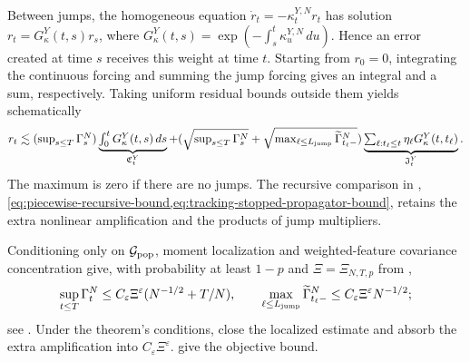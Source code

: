 Between jumps, the homogeneous equation
\(\dot r_t=-\kappa_t^{Y,N}r_t\) has solution
\(r_t=G_\kappa^Y(t,s)r_s\), where
\(G_\kappa^Y(t,s)=\exp(-\int_s^t\kappa_u^{Y,N}\,du)\).
Hence an error created at time \(s\) receives this weight at time \(t\).
Starting from \(r_0=0\), integrating the continuous forcing and summing
the jump forcing gives an integral and a sum, respectively.
Taking uniform residual bounds outside them yields schematically
\[
 \textstyle r_t\lesssim
 (\sup_{s\le T}\Gamma_s^N)
 \underbrace{\textstyle\int_0^tG_\kappa^Y(t,s)\,ds}_{\mathfrak C_t^Y}
 +(\sqrt{\sup_{s\le T}\Gamma_s^N}
       +\sqrt{\max_{\ell\le L_{\mathrm{jump}}}\widetilde\Gamma_{t_\ell-}^N})
 \underbrace{\textstyle\sum_{\ell:t_\ell\le t}\eta_\ell
                  G_\kappa^Y(t,t_\ell)}_{\mathfrak J_t^Y}.
\]
The maximum is zero if there are no jumps.
The recursive comparison in ,
\cref{eq:piecewise-recursive-bound,eq:tracking-stopped-propagator-bound},
retains the extra nonlinear amplification and the products of jump multipliers.

Conditioning only on \(\mathcal G_{\rm pop}\), moment localization and
weighted-feature covariance concentration give, with probability at least
\(1-p\) and \(\Xi=\Xi_{N,T,p}\) from ,
\[
 \sup_{t\le T}\Gamma_t^N
 \le C_\varepsilon\Xi^\varepsilon(N^{-1/2}+T/N),\qquad
 \max_{\ell\le L_{\mathrm{jump}}}\widetilde\Gamma_{t_\ell-}^N
 \le C_\varepsilon\Xi^\varepsilon N^{-1/2};
\]
see .
Under the theorem's conditions,
close the localized estimate and absorb the extra amplification into
\(C_\varepsilon\Xi^\varepsilon\).
give the objective bound.
